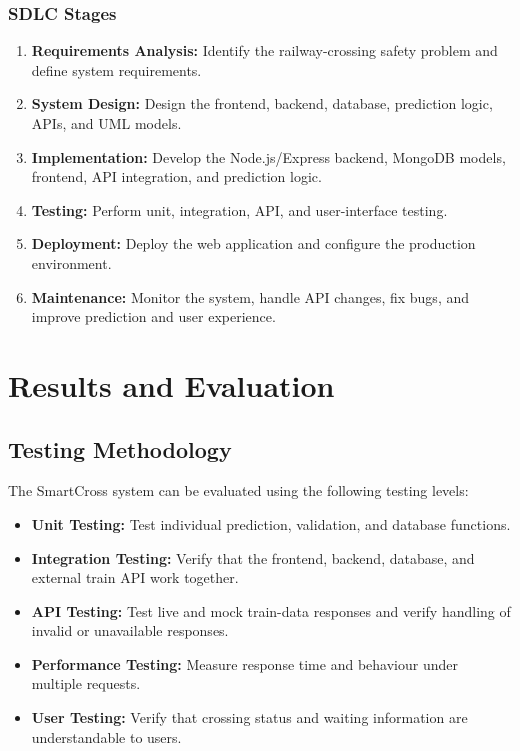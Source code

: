 \documentclass[12pt,a4paper]{report}
\begin{document}
\subsection{SDLC Stages}

\begin{enumerate}
  \item \textbf{Requirements Analysis:} Identify the railway-crossing safety
        problem and define system requirements.
  \item \textbf{System Design:} Design the frontend, backend, database,
        prediction logic, APIs, and UML models.
  \item \textbf{Implementation:} Develop the Node.js/Express backend, MongoDB
        models, frontend, API integration, and prediction logic.
  \item \textbf{Testing:} Perform unit, integration, API, and user-interface
        testing.
  \item \textbf{Deployment:} Deploy the web application and configure the
        production environment.
  \item \textbf{Maintenance:} Monitor the system, handle API changes, fix bugs,
        and improve prediction and user experience.
\end{enumerate}


\chapter{Results and Evaluation}

\section{Testing Methodology}

The SmartCross system can be evaluated using the following testing levels:

\begin{itemize}
  \item \textbf{Unit Testing:} Test individual prediction, validation, and
        database functions.
  \item \textbf{Integration Testing:} Verify that the frontend, backend,
        database, and external train API work together.
  \item \textbf{API Testing:} Test live and mock train-data responses and verify
        handling of invalid or unavailable responses.
  \item \textbf{Performance Testing:} Measure response time and behaviour under
        multiple requests.
  \item \textbf{User Testing:} Verify that crossing status and waiting information
        are understandable to users.
\end{itemize}
\end{document}
